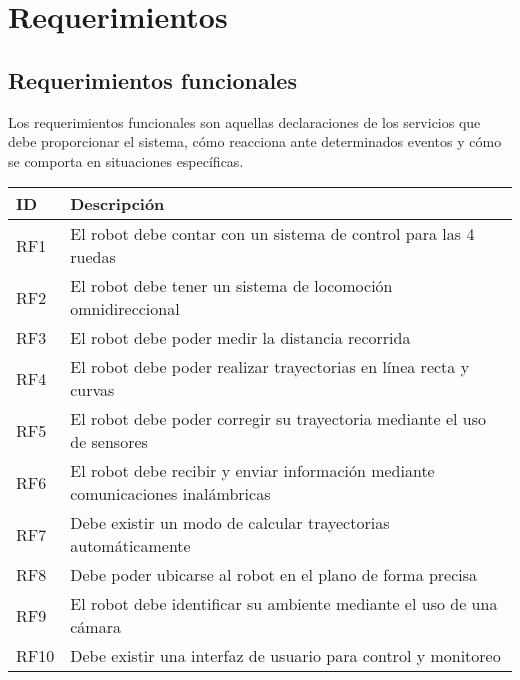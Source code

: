 \chapter{Requerimientos}

\section{Requerimientos funcionales}

Los requerimientos funcionales son aquellas declaraciones de los servicios que debe proporcionar el sistema, cómo reacciona ante determinados eventos y cómo se comporta en situaciones específicas.

\begin{center} 
    \begin{tabular} {
        | >{\centering\arraybackslash}m{1cm}
        | >{\centering\arraybackslash}m{13cm}|}
        \hline \rowcolor{test_header_color}
            ID & Descripción \\
        \hline
            RF1 & El robot debe contar con un sistema de control para las 4 ruedas \\ 
        \hline
            RF2 & El robot debe tener un sistema de locomoción omnidireccional \\ 
        \hline
            RF3 & El robot debe poder medir la distancia recorrida \\ 
        \hline
            RF4 & El robot debe poder realizar trayectorias en línea recta y curvas \\ 
        \hline
            RF5 & El robot debe poder corregir su trayectoria mediante el uso de sensores \\ 
        \hline
            RF6 & El robot debe recibir y enviar información mediante comunicaciones inalámbricas \\ 
        \hline
            RF7 & Debe existir un modo de calcular trayectorias automáticamente \\
        \hline
            RF8 & Debe poder ubicarse al robot en el plano de forma precisa \\
        \hline
            RF9 & El robot debe identificar su ambiente mediante el uso de una cámara \\ 
        \hline
            RF10 & Debe existir una interfaz de usuario para control y monitoreo \\ 
        \hline
    \end{tabular}
\end{center}

